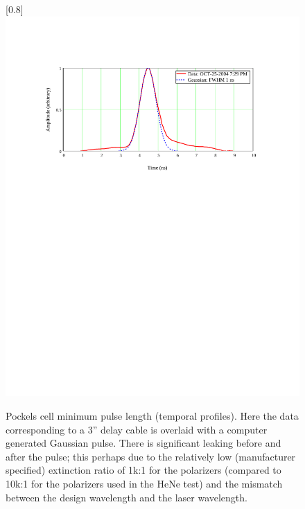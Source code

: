 \begin{figure}
\scalebox{0.8}[0.8]{
\includegraphics[bb=35 467 523 689]
{temporal_profiles/temporal_profiles.pdf}
}
\caption[Pockels cell minimum pulse length (temporal profiles)]{Pockels cell minimum pulse length (temporal profiles). Here the data corresponding to a 3'' delay cable is overlaid with a computer generated Gaussian pulse. There is significant leaking before and after the pulse; this perhaps due to the relatively low (manufacturer specified) extinction ratio of 1k:1 for the polarizers (compared to 10k:1 for the polarizers used in the HeNe test) and the mismatch between the design wavelength and the laser wavelength.}
\label{temporal profiles}
\end{figure}
